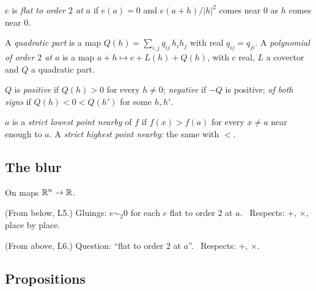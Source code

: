 \begin{lines}
\item[\lab{D1}] $e$ is \emph{flat to order $2$ at $a$} if $e(a) = 0$ and $e(a + h)/|h|^2$ comes near $0$ as $h$ comes near $0$.
\item[\lab{D2}] A \emph{quadratic part} is a map $Q(h) = \sum_{i,j} q_{ij}\,h_i h_j$ with real $q_{ij} = q_{ji}$. A \emph{polynomial of order $2$ at $a$} is a map $a + h \mapsto c + L(h) + Q(h)$, with $c$ real, $L$ a covector and $Q$ a quadratic part.
\item[\lab{D3}] $Q$ is \emph{positive} if $Q(h) > 0$ for every $h \neq 0$; \emph{negative} if $-Q$ is positive; \emph{of both signs} if $Q(h) < 0 < Q(h')$ for some $h, h'$.
\item[\lab{D4}] $a$ is a \emph{strict lowest point nearby} of $f$ if $f(x) > f(a)$ for every $x \neq a$ near enough to $a$. A \emph{strict highest point nearby}: the same with $<$.
\end{lines}

\subsection*{The blur}

On maps $\mathbb{R}^n \to \mathbb{R}$.

\begin{lines}
\item[\lab{B1}] (From below, L5.) Gluings: $e \sim_2 0$ for each $e$ flat to order $2$ at $a$. \ Respects: $+$, $\times$, place by place.
\item[\lab{B2}] (From above, L6.) Question: ``flat to order $2$ at $a$''. \ Respects: $+$, $\times$.
\end{lines}

\subsection*{Propositions}

